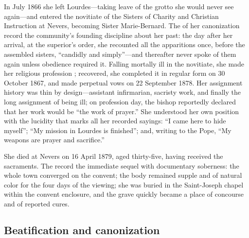 In July 1866 she left Lourdes---taking leave of the grotto she
would never see again---and entered the novitiate of the Sisters
of Charity and Christian Instruction at Nevers, becoming Sister
Marie-Bernard. The  of her canonization
record the community's founding discipline about her past: the
day after her arrival, at the superior's order, she recounted all
the apparitions once, before the assembled sisters, ``candidly
and simply''---and thereafter never spoke of them again unless
obedience required it. Falling mortally ill in the novitiate, she
made her religious profession ; recovered, she
completed it in regular form on 30 October 1867, and made
perpetual vows on 22 September 1878. Her assignment history was thin by
design---assistant infirmarian, sacristy work, and finally the
long assignment of being ill; on profession day, the bishop
reportedly declared that her work would be ``the work of
prayer.'' She understood her own position with the lucidity that
marks all her recorded sayings: ``I came here to hide myself'';
``My mission in Lourdes is finished''; and, writing to the Pope,
``My weapons are prayer and sacrifice.''

She died at Nevers on 16 April 1879, aged thirty-five, having
received the sacraments. The  record
the immediate sequel with documentary soberness: the whole town
converged on the convent; the body remained supple and of natural
color for the four days of the viewing; she was buried in the
Saint-Joseph chapel within the convent enclosure, and the grave
quickly became a place of concourse and of reported
cures.

\subsection{Beatification and canonization}

